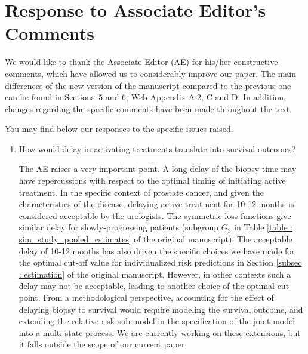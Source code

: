 \clearpage
\section*{Response to Associate Editor's Comments}
We would like to thank the Associate Editor (AE) for his/her constructive comments, which have allowed us to considerably improve our paper. The main differences of the new version of the manuscript compared to the previous one can be found in Sections~5 and 6, Web Appendix A.2, C and D. In addition, changes regarding the specific comments have been made throughout the text.

You may find below our responses to the specific issues raised.

\begin{enumerate}
	\item \underline{How would delay in activating treatments translate into survival outcomes?}

The AE raises a very important point. A long delay of the biopsy time may have repercussions with respect to the optimal timing of initiating active treatment. In the specific context of prostate cancer, and given the characteristics of the disease, delaying active treatment for 10-12 months is considered acceptable by the urologists. The symmetric loss functions give similar delay for slowly-progressing patients (subgroup $G_3$ in Table \ref{table : sim_study_pooled_estimates} of the original manuscript). The acceptable delay of 10-12 months  has also driven the specific choices we have made for the optimal cut-off value for individualized risk predictions in Section \ref{subsec : estimation} of the original manuscript. However, in other contexts such a delay may not be acceptable, leading to another choice of the optimal cut-point. From a methodological perspective, accounting for the effect of delaying biopsy to survival would require modeling the survival outcome, and extending the relative risk sub-model in the specification of the joint model into a multi-state process. We are currently working on these extensions, but it falls outside the scope of our current paper.

\end{enumerate}


